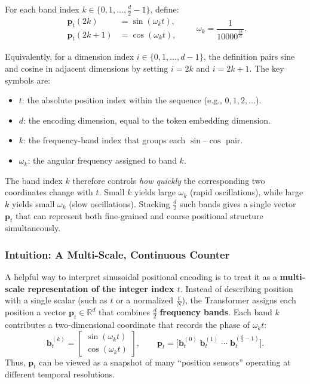 \noindent
For each band index \(k \in \{0,1,\dots,\frac{d}{2}-1\}\), define:
\begin{equation}
	\label{eq:chapter17_sinusoidal_encoding}
	\begin{aligned}
		\mathbf{p}_t(2k)   &= \sin(\omega_k t),\\
		\mathbf{p}_t(2k+1) &= \cos(\omega_k t),
	\end{aligned}
	\qquad
	\omega_k = \frac{1}{10000^{\frac{2k}{d}}}.
\end{equation}

\noindent
Equivalently, for a dimension index \(i \in \{0,1,\dots,d-1\}\), the definition pairs sine and cosine in adjacent dimensions by setting \(i=2k\) and \(i=2k+1\).
The key symbols are:
\begin{itemize}
	\item \(\displaystyle t\): the absolute position index within the sequence (e.g., \(0,1,2,\dots\)).
	\item \(\displaystyle d\): the encoding dimension, equal to the token embedding dimension.
	\item \(\displaystyle k\): the frequency-band index that groups each \(\sin\)--\(\cos\) pair.
	\item \(\displaystyle \omega_k\): the angular frequency assigned to band \(k\).
\end{itemize}

\noindent
The band index \(k\) therefore controls \emph{how quickly} the corresponding two coordinates change with \(t\).
Small \(k\) yields large \(\omega_k\) (rapid oscillations), while large \(k\) yields small \(\omega_k\) (slow oscillations).
Stacking \(\frac{d}{2}\) such bands gives a single vector \(\mathbf{p}_t\) that can represent both fine-grained and coarse positional structure simultaneously.

\subsubsection{Intuition: A Multi-Scale, Continuous Counter}
\noindent
A helpful way to interpret sinusoidal positional encoding is to treat it as a \textbf{multi-scale representation of the integer index \(t\)}.
Instead of describing position with a single scalar (such as \(t\) or a normalized \(\tfrac{t}{N}\)), the Transformer assigns each position a vector
\(\mathbf{p}_t \in \mathbb{R}^d\) that combines \(\tfrac{d}{2}\) \textbf{frequency bands}.
Each band \(k\) contributes a two-dimensional coordinate that records the phase of \(\omega_k t\):
\[
\mathbf{b}^{(k)}_t
=
\begin{bmatrix}
	\sin(\omega_k t)\\
	\cos(\omega_k t)
\end{bmatrix},
\qquad
\mathbf{p}_t
=
\bigl[
\mathbf{b}^{(0)}_t \;
\mathbf{b}^{(1)}_t \;
\cdots \;
\mathbf{b}^{(\frac{d}{2}-1)}_t
\bigr].
\]
Thus, \(\mathbf{p}_t\) can be viewed as a snapshot of many ``position sensors'' operating at different temporal resolutions.

